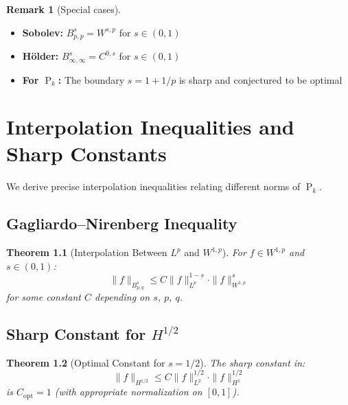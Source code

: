 ﻿\documentclass[12pt,a4paper]{report}
\theoremstyle{plain}
\newtheorem{theorem}{Theorem}[section]
\theoremstyle{definition}
\newtheorem{remark}[theorem]{Remark}
\DeclareMathOperator{\Pk}{P}
\begin{document}
\begin{remark}[Special cases]
\begin{itemize}
    \item \textbf{Sobolev:} $B^s_{p,p} = W^{s,p}$ for $s \in (0,1)$
    \item \textbf{H\"older:} $B^s_{\infty,\infty} = C^{0,s}$ for $s \in (0,1)$
    \item \textbf{For $\Pk_k$:} The boundary $s = 1 + 1/p$ is sharp and conjectured to be optimal
\end{itemize}
\end{remark}

\chapter{Interpolation Inequalities and Sharp Constants}
\label{ch:interpolation}

We derive precise interpolation inequalities relating different norms of $\Pk_k$.

\section{Gagliardo--Nirenberg Inequality}

\begin{theorem}[Interpolation Between $L^p$ and $W^{1,p}$]
\label{thm:GN_interp}
For $f \in W^{1,p}$ and $s \in (0,1)$:
\[
\|f\|_{B^s_{p,q}} \leq C \|f\|_{L^p}^{1-s} \cdot \|f\|_{W^{1,p}}^s
\]
for some constant $C$ depending on $s$, $p$, $q$.
\end{theorem}

\section{Sharp Constant for $H^{1/2}$}

\begin{theorem}[Optimal Constant for $s=1/2$]
\label{thm:sharp_H12}
The sharp constant in:
\[
\|f\|_{H^{1/2}} \leq C \|f\|_{L^2}^{1/2} \cdot \|f\|_{H^1}^{1/2}
\]
is $C_{\text{opt}} = 1$ (with appropriate normalization on $[0,1]$).
\end{theorem}
\end{document}
